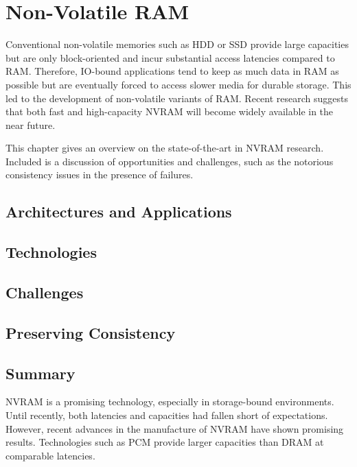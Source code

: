 \chapter{Non-Volatile RAM}
\label{ch:nvram}

Conventional non-volatile memories such as HDD or SSD provide large capacities
but are only block-oriented and incur substantial access latencies compared to
RAM. Therefore, IO-bound applications tend to keep as much data in RAM as
possible but are eventually forced to access slower media for durable storage.
This led to the development of non-volatile variants of RAM. Recent research
suggests that both fast and high-capacity NVRAM will become widely available in
the near future.

This chapter gives an overview on the state-of-the-art in NVRAM research.
Included is a discussion of opportunities and challenges, such as the notorious
consistency issues in the presence of failures.

\section{Architectures and Applications}
\label{ch:nvram-architectures}


\section{Technologies}
\label{ch:nvram-technologies}


\section{Challenges}
\label{ch:nvram-challenges}


\section{Preserving Consistency}
\label{ch:nvram-consistency}


\section{Summary}
\label{ch:nvram-summary}

NVRAM is a promising technology, especially in storage-bound environments. Until
recently, both latencies and capacities had fallen short of expectations.
However, recent advances in the manufacture of NVRAM have shown promising
results. Technologies such as PCM provide larger capacities than DRAM at
comparable latencies.

